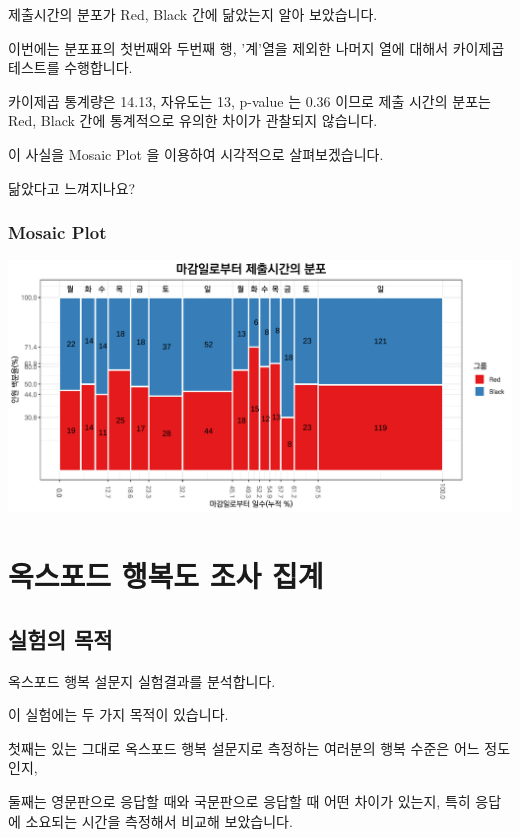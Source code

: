 \documentclass[
]{book}
\begin{document}
제출시간의 분포가 Red, Black 간에 닮았는지 알아 보았습니다.

이번에는 분포표의 첫번째와 두번째 행, '계'열을 제외한 나머지 열에 대해서 카이제곱테스트를 수행합니다.

카이제곱 통계량은 14.13, 자유도는 13, p-value 는 0.36 이므로 제출 시간의 분포는 Red, Black 간에 통계적으로 유의한 차이가 관찰되지 않습니다.

이 사실을 Mosaic Plot 을 이용하여 시각적으로 살펴보겠습니다.

닮았다고 느껴지나요?

\subsection{Mosaic Plot}\label{mosaic-plot-19}

\includegraphics{Quiz_report_2025_files/figure-latex/unnamed-chunk-229-1.pdf}

\chapter{옥스포드 행복도 조사 집계}\label{uxc625uxc2a4uxd3ecuxb4dc-uxd589uxbcf5uxb3c4-uxc870uxc0ac-uxc9d1uxacc4}

\section{실험의 목적}\label{uxc2e4uxd5d8uxc758-uxbaa9uxc801-8}

옥스포드 행복 설문지 실험결과를 분석합니다.

이 실험에는 두 가지 목적이 있습니다.

첫째는 있는 그대로 옥스포드 행복 설문지로 측정하는 여러분의 행복 수준은 어느 정도인지,

둘째는 영문판으로 응답할 때와 국문판으로 응답할 때 어떤 차이가 있는지, 특히 응답에 소요되는 시간을 측정해서 비교해 보았습니다.
\end{document}
